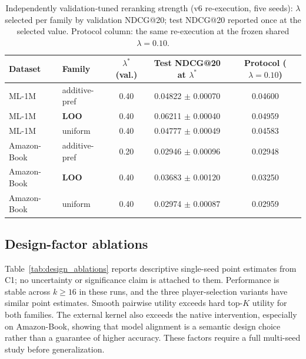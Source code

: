 \documentclass[pdflatex,sn-mathphys-num]{sn-jnl}
\begin{document}
\begin{table}[t]
\caption{Independently validation-tuned reranking strength (v6 re-execution, five seeds): $\lambda$ selected per family by validation NDCG@20; test NDCG@20 reported once at the selected value. Protocol column: the same re-execution at the frozen shared $\lambda=0.10$.}\label{tab:lambda_tuned}
\centering
\small
\begin{tabular}{llccc}
\toprule
Dataset & Family & $\lambda^*$ (val.) & Test NDCG@20 at $\lambda^*$ & Protocol ($\lambda{=}0.10$) \\
\midrule
ML-1M & additive-pref & 0.40 & 0.04822 $\pm$ 0.00070 & 0.04600 \\
ML-1M & \textbf{LOO} & 0.40 & 0.06211 $\pm$ 0.00040 & 0.04959 \\
ML-1M & uniform & 0.40 & 0.04777 $\pm$ 0.00049 & 0.04583 \\
Amazon-Book & additive-pref & 0.20 & 0.02946 $\pm$ 0.00096 & 0.02948 \\
Amazon-Book & \textbf{LOO} & 0.40 & 0.03683 $\pm$ 0.00120 & 0.03250 \\
Amazon-Book & uniform & 0.40 & 0.02974 $\pm$ 0.00087 & 0.02959 \\
\bottomrule
\end{tabular}
\end{table}

\subsection{Design-factor ablations}\label{subsec:design_ablations}

Table~\ref{tab:design_ablations} reports descriptive single-seed point estimates from C1; no uncertainty or significance claim is attached to them. Performance is stable across $k\ge16$ in these runs, and the three player-selection variants have similar point estimates. Smooth pairwise utility exceeds hard top-$K$ utility for both families. The external kernel also exceeds the native intervention, especially on Amazon-Book, showing that model alignment is a semantic design choice rather than a guarantee of higher accuracy. These factors require a full multi-seed study before generalization.
\end{document}
